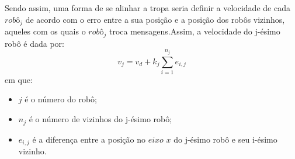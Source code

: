 Sendo assim, uma forma de se alinhar a tropa seria definir a velocidade de cada $robô_{j}$ de acordo com o erro entre a sua posição e a posição dos robôs vizinhos, aqueles com os quais o $robô_{j}$ troca mensagens.Assim, a velocidade do j-ésimo robô é dada por:
\begin{equation}
	v_{j} = v_{d} + k_{j} \sum\limits_{i = 1}^{n_{j}} e_{i,j}
	\label{eq:velP1}
\end{equation}
em que:
\begin{itemize}
	\item $j$ é o número do robô;
	\item $n_{j}$ é o número de vizinhos do j-ésimo robô;
	\item $e_{i,j}$ é a diferença entre a posição no $eixo$ $x$ do j-ésimo robô e seu i-ésimo vizinho.
\end{itemize}

